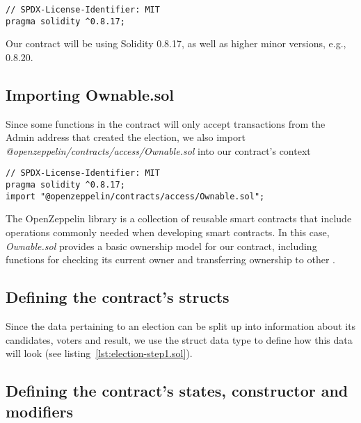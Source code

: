 \begin{verbatim}
// SPDX-License-Identifier: MIT
pragma solidity ^0.8.17;
\end{verbatim}

Our contract will be using Solidity 0.8.17, as well as higher minor versions, e.g., 0.8.20.

\subsection{Importing Ownable.sol}\label{subsec:impotring-ownable.sol}

Since some functions in the contract will only accept transactions from the \gls{Admin} address that created the election, we also import \emph{@openzeppelin/contracts/access/Ownable.sol} into our contract's context

\begin{verbatim}
// SPDX-License-Identifier: MIT
pragma solidity ^0.8.17;
import "@openzeppelin/contracts/access/Ownable.sol";
\end{verbatim}

The OpenZeppelin library is a collection of reusable smart contracts that include operations commonly needed when developing smart contracts.
In this case, \emph{Ownable.sol} provides a basic ownership model for our contract, including functions for checking its current owner and transferring ownership to other .

\subsection{Defining the contract's structs}\label{subsec:defining-the-contracts-structs}


Since the data pertaining to an election can be split up into information about its candidates, voters and result, we use the struct data type to define how this data will look (see listing~\ref{lst:election-step1.sol}).

\subsection{Defining the contract's states, constructor and modifiers}\label{subsec:defining-the-contract's-states-constructor-and-modifiers}

